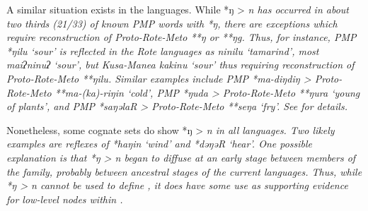 A similar situation exists in the  languages.
While *ŋ > \it{n} has occurred in about two thirds (21/33) of
known PMP words with *ŋ,
there are exceptions which require reconstruction of Proto-Rote-Meto **ŋ or **ŋg.
Thus, for instance, PMP *ŋilu ‘sour’ is reflected in the Rote
languages as \it{ni{\tl}nilu} ‘tamarind’,
most  \it{maiʔninuʔ} ‘sour’,
but Kusa-Manea \it{ka{\tl}kinu} ‘sour’ thus requiring reconstruction of Proto-Rote-Meto **ŋilu.
Similar examples include PMP \mbox{*ma-diŋdiŋ} > Proto-Rote-Meto
**ma-(ka)-riŋin ‘cold’, PMP *ŋuda > Proto-Rote-Meto **ŋura ‘young of plants’,
and PMP *saŋəlaR > Proto-Rote-Meto **seŋa ‘fry’.
See \citet{Edwards2021} for details.

\newpage
Nonetheless, some cognate sets do show *ŋ > \it{n}
in all  languages.
Two likely examples are reflexes of *haŋin ‘wind’ and *dəŋəR ‘hear’.
One possible explanation is that *ŋ > \it{n} began to diffuse
at an early stage between members of the  family,
probably between ancestral stages of the current languages.
Thus, while *ŋ > \it{n} cannot be used to define ,
it does have some use as supporting evidence for low-level nodes within .

